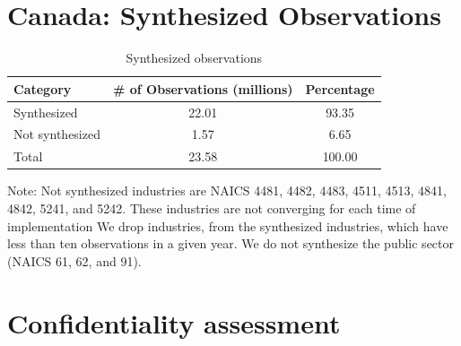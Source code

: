 \documentclass[10pt,twoside]{article}
\begin{document}
\section{Canada: Synthesized Observations}
\label{sec:synth_obs}


\begin{table}[H]
  \centering
\begin{threeparttable}
  \caption{Synthesized observations}  \label{tab:Synthesized_observations} \medskip
  \renewcommand{\arraystretch}{1}
  \begin{tabular}{l  c c }
    \toprule
    \textbf{Category}&\textbf{\# of Observations (millions)}&\textbf{Percentage}\\
    \midrule
Synthesized&22.01&93.35\\
Not synthesized&1.57&6.65\\
Total&23.58&100.00\\
    \bottomrule
  \end{tabular} 
\begin{tablenotes}
\small
\item Note: Not synthesized industries are NAICS 4481,    4482,     4483,     4511,     4513,     4841,     4842, 5241, and 5242. These industries are not converging for each time of implementation We drop industries, from the synthesized industries, which have less than ten observations in a given year. We do not synthesize the public sector (NAICS 61, 62, and 91).
 \end{tablenotes}
 \end{threeparttable}
\end{table}
 
\section{Confidentiality assessment}
\label{sec:conf:appendix}
\end{document}
